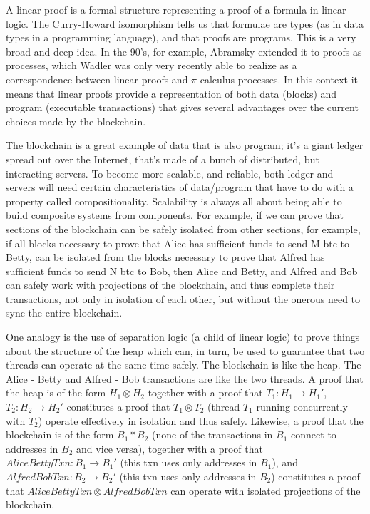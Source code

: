 \documentclass[fleqn]{acm_proc_article-sp}
\numberwithin{equation}{subsection}
\begin{document}
A linear proof is a formal structure representing a proof of a formula
in linear logic.  The Curry-Howard isomorphism tells us that formulae
are types (as in data types in a programming language), and that
proofs are programs. This is a very broad and deep idea. In the 90's,
for example, Abramsky extended it to proofs as processes, which Wadler
was only very recently able to realize as a correspondence between
linear proofs and {$\pi$}-calculus processes. In this context it means that
linear proofs provide a representation of both data (blocks) and
program (executable transactions) that gives several advantages over
the current choices made by the blockchain.

The blockchain is a great example of data that is also program; it's a
giant ledger spread out over the Internet, that's made of a bunch of
distributed, but interacting servers. To become more scalable, and
reliable, both ledger and servers will need certain characteristics of
data/program that have to do with a property called
compositionality. Scalability is always all about being able to build
composite systems from components. For example, if we can prove that
sections of the blockchain can be safely isolated from other sections,
for example, if all blocks necessary to prove that Alice has
sufficient funds to send M btc to Betty, can be isolated from the
blocks necessary to prove that Alfred has sufficient funds to send N
btc to Bob, then Alice and Betty, and Alfred and Bob can safely work
with projections of the blockchain, and thus complete their
transactions, not only in isolation of each other, but without the
onerous need to sync the entire blockchain.

One analogy is the use of separation logic (a child of linear logic)
to prove things about the structure of the heap which can, in turn, be
used to guarantee that two threads can operate at the same time
safely. The blockchain is like the heap. The Alice - Betty and Alfred
- Bob transactions are like the two threads. A proof that the heap is
of the form $H_1 \otimes H_2$ together with a proof that $T_1 : H_1 \rightarrow H_1'$, $T_2 : H_2
\rightarrow H_2'$ constitutes a proof that $T_1 \otimes T_2$ (thread $T_1$ running
concurrently with $T_2$) operate effectively in isolation and thus
safely. Likewise, a proof that the blockchain is of the form $B_1 * B_2$
(none of the transactions in $B_1$ connect to addresses in $B_2$ and vice
versa), together with a proof that $AliceBettyTxn : B_1 \rightarrow B_1'$ (this txn
uses only addresses in $B_1$), and $AlfredBobTxn : B_2 \rightarrow B_2'$ (this txn
uses only addresses in $B_2$) constitutes a proof that $AliceBettyTxn \otimes
AlfredBobTxn$ can operate with isolated projections of the blockchain.
\end{document}
